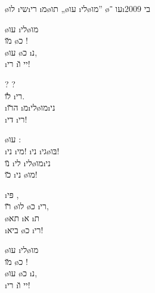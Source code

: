 \textheader%
{\o{לו} \i{שי}\i{רי} \i{מ}\o{תו} „\o{עו} \i{לי}\o{מו}”}
{ }
{}
{}
{ \o{עו}}
{־\i{בי}}
{2009}




\begin{twocol}
\begin{stanza}
\o{עו}   \i{לי}\o{מו}\\
  \u{מו} \o{כ} !\\
\o{עו} \o{כ}  \i{נ},\\
\i{רי} \i{יי} \u{ו}!
\end{stanza}

\begin{stanza}
 ?  ?\\
\u{לו} \i{רי}.\\
\i{ה}\u{רו} \i{מ}\i{לי}\o{מו}\i{ני}\\
\i{די} \i{רי}!
\end{stanza}

\begin{stanza}
 \o{עו}  :\\
\i{ני} \i{מי}! \i{ני} \i{גי}\o{בּו}!\\
\u{נו} \i{לי}  \i{לי}\o{מו}\i{ני}\\
 \u{כו} \i{ני} \o{מו}!
\end{stanza}

\begin{stanza}
\i{פּי}  ,\\
\u{רו} \o{לו} \o{כ} \i{רי},\\
\o{תא}  \i{א} \i{ת}\\
\i{ביא}  \o{כ} \i{רי}!
\end{stanza}

\begin{stanza}
\o{עו}  \i{לי}\o{מו}\\
  \u{מו} \o{כ} !\\
\o{עו} \o{כ}  \i{נ},\\
\i{רי} \i{יי} \u{ו}!
\end{stanza}


\end{twocol}
